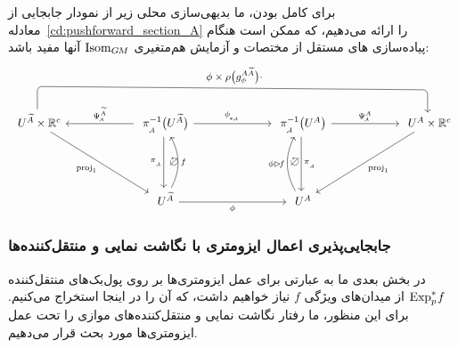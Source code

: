 برای کامل بودن، ما بدیهی‌سازی محلی زیر از نمودار جابجایی از معادله~\eqref{cd:pushforward_section_A} را ارائه می‌دهیم، که ممکن است هنگام پیاده‌سازی های مستقل از مختصات و آزمایش هم‌متغیری $\operatorname{Isom}_{G\mkern-1.4muM}$ آنها مفید باشد:
\begin{equation}\label{cd:pushforward_A_coord}
\begin{tikzcd}[column sep=60pt, row sep=45, font=\normalsize,
               execute at end picture={
                    \node [] at (-1.87, -.07) {$\noncommutative$};
                    \node [] at ( 1.87, -.07) {$\noncommutative$};
                    }]
    U^{\widetilde{A}} \times \R^c
        \arrow[rd, "\proj_1"']
        \arrow[rrr, rounded corners, to path={ 
                -- ([yshift=2em]\tikztostart.north) 
                --node[above]{\small$\phi \times \rho\big(g^{A\widetilde{A}}_\phi\big) \cdot$} ([yshift=2em]\tikztotarget.north) 
                -- (\tikztotarget.north)
                }]
    &
    \piA^{-1}\big(U^{\widetilde{A}}\big)
        \arrow[r, "\dphiA"]
        \arrow[d, "\piA"']
        \arrow[l, "\PsiA^{\widetilde{A}}"']
    &[2ex]
    \piA^{-1}\big(U^A\big)
        \arrow[d, "\piA"]
        \arrow[r, "\PsiA^A"]
    &
    U^A \times \R^c
        \arrow[ld, "\proj_1"]
    \\
    &
    U^{\widetilde{A}}
        \arrow[r, "\phi"']
        \arrow[u, "f"', bend right=28]
    &
    U^A
        \arrow[u, "\ \phi\rhd\!f", bend left=28]
\end{tikzcd}
\end{equation}






\subsubsection{جابجایی‌پذیری اعمال ایزومتری با نگاشت نمایی و منتقل‌کننده‌ها}
\label{sec:isom_expmap_transport}

در بخش بعدی ما به عبارتی برای عمل ایزومتری‌ها بر روی پول‌بک‌های منتقل‌کننده $\operatorname{Exp}^*_p\mkern-2mu f$ از میدان‌های ویژگی $f$ نیاز خواهیم داشت، که آن را در اینجا استخراج می‌کنیم.
برای این منظور، ما رفتار نگاشت نمایی و منتقل‌کننده‌های موازی را تحت عمل ایزومتری‌ها مورد بحث قرار می‌دهیم.



